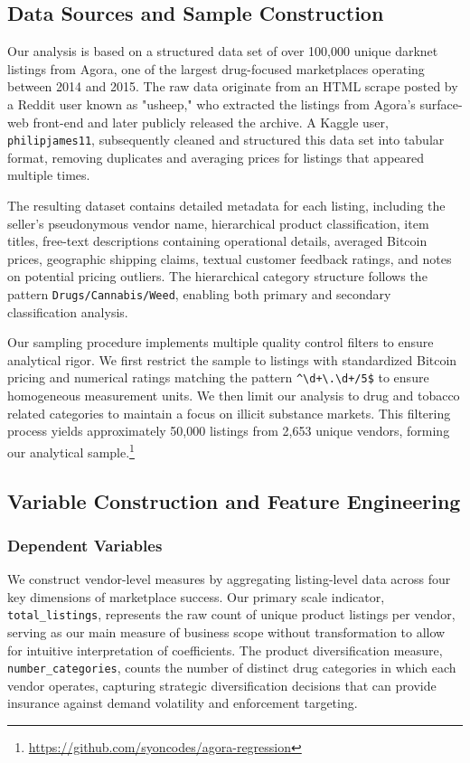 \documentclass{article}
\begin{document}
\subsection{Data Sources and Sample Construction}

Our analysis is based on a structured data set of over 100,000 unique darknet listings from Agora, one of the largest drug-focused marketplaces operating between 2014 and 2015. The raw data originate from an HTML scrape posted by a Reddit user known as "usheep," who extracted the listings from Agora's surface-web front-end and later publicly released the archive. A Kaggle user, \texttt{philipjames11}, subsequently cleaned and structured this data set into tabular format, removing duplicates and averaging prices for listings that appeared multiple times.

The resulting dataset contains detailed metadata for each listing, including the seller's pseudonymous vendor name, hierarchical product classification, item titles, free-text descriptions containing operational details, averaged Bitcoin prices, geographic shipping claims, textual customer feedback ratings, and notes on potential pricing outliers. The hierarchical category structure follows the pattern \texttt{Drugs/Cannabis/Weed}, enabling both primary and secondary classification analysis.

Our sampling procedure implements multiple quality control filters to ensure analytical rigor. We first restrict the sample to listings with standardized Bitcoin pricing and numerical ratings matching the pattern \verb!^\d+\.\d+/5$! to ensure homogeneous measurement units. We then limit our analysis to drug and tobacco related categories to maintain a focus on illicit substance markets. This filtering process yields approximately 50,000 listings from 2,653 unique vendors, forming our analytical sample.\footnote{\url{https://github.com/syoncodes/agora-regression}}

\subsection{Variable Construction and Feature Engineering}

\subsubsection{Dependent Variables}

We construct vendor-level measures by aggregating listing-level data across four key dimensions of marketplace success. Our primary scale indicator, \texttt{total_listings}, represents the raw count of unique product listings per vendor, serving as our main measure of business scope without transformation to allow for intuitive interpretation of coefficients. The product diversification measure, \texttt{number_categories}, counts the number of distinct drug categories in which each vendor operates, capturing strategic diversification decisions that can provide insurance against demand volatility and enforcement targeting.
\end{document}
